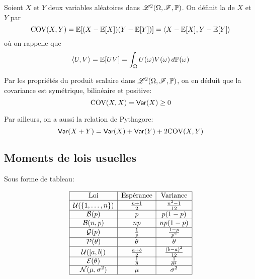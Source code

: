 \begin{definition}
    Soient \(X\) et \(Y\) deux variables aléatoires dans \(\mathscr{L}^2(\Omega, \mathscr{F}, \mathbb{P})\).
    On définit la  de \(X\) et \(Y\) par
    \begin{equation*}
        \text{COV}(X,Y) = \mathbb{E}\mathopen{}\left[(X-\mathbb{E}\mathopen{}\left[X\right]\mathclose{})(Y-\mathbb{E}\mathopen{}\left[Y\right]\mathclose{})\right]\mathclose{} = \langle X-\mathbb{E}\mathopen{}\left[X\right]\mathclose{}, Y-\mathbb{E}\mathopen{}\left[Y\right]\mathclose{}\rangle
    \end{equation*}
    où on rappelle que
    \begin{equation*}
        \langle U, V\rangle = \mathbb{E}\mathopen{}\left[UV\right]\mathclose{} = \int_{\Omega} U(\omega)V(\omega)\mathop{}\!{d}\mathbb{P}(\omega)
    \end{equation*}

    Par les propriétés du produit scalaire dans \(\mathscr{L}^2(\Omega, \mathscr{F}, \mathbb{P})\), on en
    déduit que la covariance est symétrique, bilinéaire et positive:
    \begin{equation*}
        \text{COV}(X,X) = \operatorname{\mathsf{Var}}(X) \geq 0
    \end{equation*}

    Par ailleurs, on a aussi la relation de Pythagore:
    \begin{equation*}
        \operatorname{\mathsf{Var}}(X+Y) = \operatorname{\mathsf{Var}}(X) + \operatorname{\mathsf{Var}}(Y) + 2\text{COV}(X,Y)
    \end{equation*}
\end{definition}

\subsection{Moments de lois usuelles}

Sous forme de tableau:

\begin{equation*}
    \begin{array}{|c|c|c|}
        \hline
        \text{Loi} & \text{Espérance} & \text{Variance}\\
        \hline
        \mathcal U(\{1,\ldots,n\}) & \frac{n+1}2 & \frac{n^2-1}{12}\\
        \hline
        \mathcal B(p) & p & p(1-p)\\
        \hline
        \mathcal B(n,p) & np & np(1-p)\\
        \hline
        \mathcal G(p) & \frac{1}{p} & \frac{1-p}{p^2}\\
        \hline
        \mathcal P(\theta) & \theta & \theta\\
        \hline
        \mathcal U(\mathopen{}\left[a,b\right]\mathclose{}) & \frac{a+b}{2} & \frac{{(b-a)}^2}{12}\\
        \hline
        \mathcal E(\theta) & \frac{1}{\theta} & \frac{1}{\theta^2}\\
        \hline
        \mathcal N(\mu,\sigma^2) & \mu & \sigma^2\\
        \hline
    \end{array}
\end{equation*}

